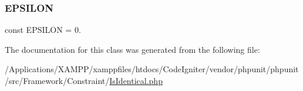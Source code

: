 \subsubsection{\texorpdfstring{E\+P\+S\+I\+L\+ON}{EPSILON}}
{\footnotesize\ttfamily const E\+P\+S\+I\+L\+ON = 0.}



The documentation for this class was generated from the following file\+:\begin{DoxyCompactItemize}
\item 
/\+Applications/\+X\+A\+M\+P\+P/xamppfiles/htdocs/\+Code\+Igniter/vendor/phpunit/phpunit/src/\+Framework/\+Constraint/\mbox{\hyperlink{_is_identical_8php}{Is\+Identical.\+php}}\end{DoxyCompactItemize}
